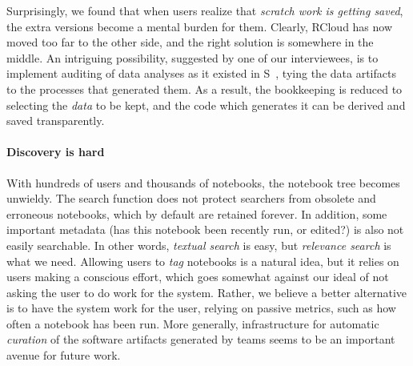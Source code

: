 Surprisingly, we found that when users realize that \emph{scratch work
  is getting saved}, the extra versions become a mental burden for
them. Clearly, RCloud has now moved too far to the other side, and the
right solution is somewhere in the middle. An intriguing possibility,
suggested by one of our interviewees, is to implement auditing of data
analyses as it existed in S~\cite{Becker:1988:Auditing}, tying the
data artifacts to the processes that generated them. As a result, the
bookkeeping is reduced to selecting the \emph{data} to be kept, and
the code which generates it can be derived and saved transparently.




\paragraph*{Discovery is hard} 
With hundreds of users and thousands of notebooks, the notebook tree
becomes unwieldy. The search function does not protect searchers from
obsolete and erroneous notebooks, which by default are retained
forever.  In addition, some important metadata (has this notebook been
recently run, or edited?) is also not easily searchable. In other words,
\emph{textual search} is easy, but \emph{relevance search} is what we
need. Allowing users to \emph{tag} notebooks is a natural idea, but it
relies on users making a conscious effort, which goes somewhat against
our ideal of not asking the user to do work for the system. Rather, we
believe a better alternative is to have the system work for the user,
relying on passive metrics, such as how often a notebook has been run.
More generally, infrastructure for automatic \emph{curation} of the
software artifacts generated by teams seems to be an important avenue
for future work.

